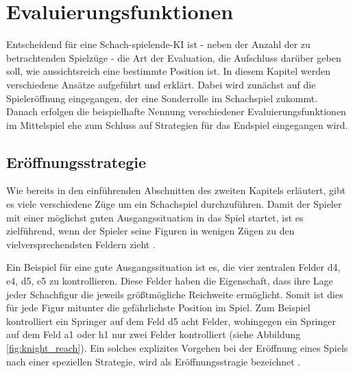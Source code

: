 \section{Evaluierungsfunktionen}\label{evaluation_func}

Entscheidend für eine Schach-spielende-KI ist - neben der Anzahl der zu betrachtenden Spielzüge - die Art der Evaluation, die Aufschluss darüber geben soll, wie aussichtsreich eine bestimmte Position ist. In diesem Kapitel werden verschiedene Ansätze aufgeführt und erklärt. Dabei wird zunächst auf die Spieleröffnung eingegangen, der eine Sonderrolle im Schachspiel zukommt. Danach erfolgen die beispielhafte Nennung verschiedener Evaluierungsfunktionen im Mittelspiel ehe zum Schluss auf Strategien für das Endspiel eingegangen wird.

\subsection{Eröffnungsstrategie}\label{opening_evaluation}
Wie bereits in den einführenden Abschnitten des zweiten Kapitels erläutert, gibt es viele verschiedene Züge um ein Schachspiel durchzuführen. Damit der Spieler mit einer möglichst guten Ausgangssituation in das Spiel startet, ist es zielführend, wenn der Spieler seine Figuren in wenigen  Zügen zu den vielversprechendsten Feldern zieht \cite{O.V.}.


Ein Beispiel für eine gute Ausgangssituation ist es, die vier zentralen Felder d4, e4, d5, e5 zu kontrollieren. Diese Felder haben die Eigenschaft, dass ihre Lage jeder Schachfigur die jeweils größtmögliche Reichweite ermöglicht. Somit ist dies für jede Figur mitunter die gefährlichste Position im Spiel. Zum Beispiel kontrolliert ein Springer auf dem Feld d5 acht Felder, wohingegen ein Springer auf dem Feld a1 oder h1 nur zwei Felder kontrolliert (siehe Abbildung \ref{fig:knight_reach}). Ein solches explizites Vorgehen bei der Eröffnung eines Spiels nach einer speziellen Strategie, wird als Eröffnungsstragie bezeichnet \cite{O.V.2017}.

